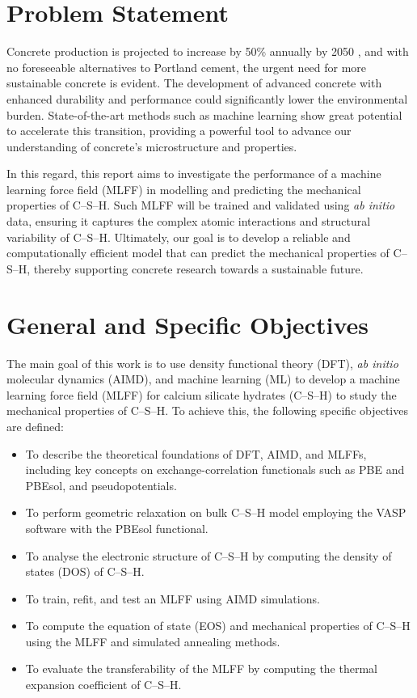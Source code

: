\section{Problem Statement}
Concrete production is projected to increase by 50\% annually by 2050 \cite{Monteiro2017}, and with no foreseeable alternatives to Portland cement, the urgent need for more sustainable concrete is evident. The development of advanced concrete with enhanced durability and performance could significantly lower the environmental burden. State-of-the-art methods such as machine learning show great potential to accelerate this transition, providing a powerful tool to advance our understanding of concrete's microstructure and properties. 

In this regard, this report aims to investigate the performance of a machine learning force field (MLFF) in modelling and predicting the mechanical properties of C--S--H. Such MLFF will be trained and validated
using \emph{ab initio} data, ensuring it captures the complex atomic interactions and structural variability of C--S--H. Ultimately, our goal is to develop a reliable and computationally efficient model that can predict the mechanical properties of C--S--H, thereby supporting concrete research towards a sustainable future.

\section{General and Specific Objectives}
The main goal of this work is to use density functional theory (DFT), \emph{ab initio} molecular dynamics (AIMD), and machine learning (ML) to
develop a machine learning force field (MLFF) for calcium silicate hydrates (C--S--H) to study the mechanical properties of C--S--H. To achieve this, the following specific objectives are defined:
\begin{itemize}
    \item To describe the theoretical foundations of DFT, AIMD, and MLFFs, including key concepts on exchange-correlation functionals such as PBE and PBEsol, and pseudopotentials. 
    \item To perform geometric relaxation on bulk C--S--H model employing the VASP software with the PBEsol functional.
    \item To analyse the electronic structure of C--S--H by computing the density of states (DOS) of C--S--H.
    \item To train, refit, and test an MLFF using AIMD simulations. 
    \item To compute the equation of state (EOS) and mechanical properties of C--S--H using the MLFF and simulated annealing methods.
    \item To evaluate the transferability of the MLFF by computing the thermal expansion coefficient of C--S--H. 
\end{itemize}

